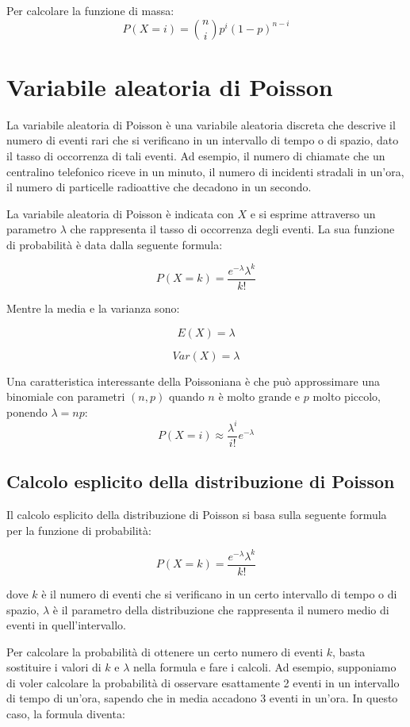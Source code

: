 Per calcolare la funzione di massa:
\begin{equation}
  P(X = i) = \binom{n}{i} p^i(1-p)^{n-i}
\end{equation}


\section{Variabile aleatoria di Poisson}
La variabile aleatoria di Poisson è una variabile aleatoria discreta che descrive il numero di eventi rari che si verificano in un intervallo di tempo o di spazio, dato il tasso di occorrenza di tali eventi. Ad esempio, il numero di chiamate che un centralino telefonico riceve in un minuto, il numero di incidenti stradali in un'ora, il numero di particelle radioattive che decadono in un secondo.

La variabile aleatoria di Poisson è indicata con $X$ e si esprime attraverso un parametro $\lambda$ che rappresenta il tasso di occorrenza degli eventi. La sua funzione di probabilità è data dalla seguente formula:

$$P(X=k) = \frac{e^{-\lambda} \lambda^k}{k!}$$

Mentre la media e la varianza sono:

$$E(X) = \lambda$$

$$Var(X) = \lambda$$


Una caratteristica interessante della Poissoniana è che può approssimare una binomiale con parametri $(n, p)$ quando
$n$ è molto grande e $p$ molto piccolo, ponendo $\lambda = np$:
\begin{equation}
  P(X = i) \approx \frac{\lambda^i}{i!}e^{-\lambda}
\end{equation}

\subsection{Calcolo esplicito della distribuzione di Poisson}

Il calcolo esplicito della distribuzione di Poisson si basa sulla seguente formula per la funzione di probabilità:

$$P(X=k) = \frac{e^{-\lambda} \lambda^k}{k!}$$

dove $k$ è il numero di eventi che si verificano in un certo intervallo di tempo o di spazio, $\lambda$ è il parametro della distribuzione che rappresenta il numero medio di eventi in quell'intervallo. 

Per calcolare la probabilità di ottenere un certo numero di eventi $k$, basta sostituire i valori di $k$ e $\lambda$ nella formula e fare i calcoli. Ad esempio, supponiamo di voler calcolare la probabilità di osservare esattamente 2 eventi in un intervallo di tempo di un'ora, sapendo che in media accadono 3 eventi in un'ora. In questo caso, la formula diventa:

